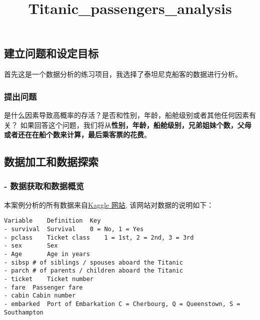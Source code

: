\documentclass[11pt]{article}
\title{Titanic\_passengers\_analysis}
\begin{document}
    
    
    \maketitle
    
    

    
    \subsection{建立问题和设定目标}\label{ux5efaux7acbux95eeux9898ux548cux8bbeux5b9aux76eeux6807}

首先这是一个数据分析的练习项目，我选择了泰坦尼克船客的数据进行分析。

\subsubsection{提出问题}\label{ux63d0ux51faux95eeux9898}

是什么因素导致高概率的存活？是否和性别，年龄，船舱级别或者其他任何因素有关？
如果回答这个问题，我们将从\textbf{性别，年龄，船舱级别，兄弟姐妹个数，父母或者还在在船个数来计算，最后乘客票的花费}。

    \subsection{数据加工和数据探索}\label{ux6570ux636eux52a0ux5de5ux548cux6570ux636eux63a2ux7d22}

\subsubsection{-
数据获取和数据概览}\label{ux6570ux636eux83b7ux53d6ux548cux6570ux636eux6982ux89c8}

本案例分析的所有数据来自\href{https://www.kaggle.com/c/titanic/data}{Kaggle
网站}, 该网站对数据的说明如下：

\begin{verbatim}
Variable    Definition  Key
- survival  Survival    0 = No, 1 = Yes
- pclass    Ticket class    1 = 1st, 2 = 2nd, 3 = 3rd
- sex       Sex 
- Age       Age in years    
- sibsp # of siblings / spouses aboard the Titanic  
- parch # of parents / children aboard the Titanic  
- ticket    Ticket number   
- fare  Passenger fare  
- cabin Cabin number    
- embarked  Port of Embarkation C = Cherbourg, Q = Queenstown, S = Southampton
\end{verbatim}
\end{document}
